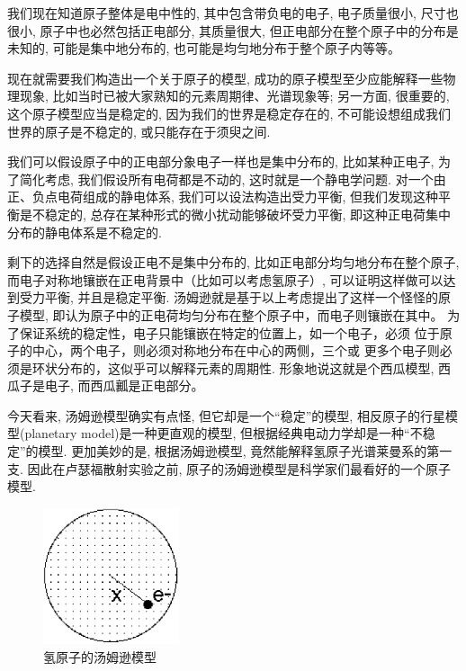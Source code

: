 我们现在知道原子整体是电中性的, 其中包含带负电的电子, 电子质量很小,
尺寸也很小, 原子中也必然包括正电部分, 其质量很大,
但正电部分在整个原子中的分布是未知的, 可能是集中地分布的,
也可能是均匀地分布于整个原子内等等。


现在就需要我们构造出一个关于原子的模型,
成功的原子模型至少应能解释一些物理现象,
比如当时已被大家熟知的元素周期律、光谱现象等; 另一方面, 很重要的,
这个原子模型应当是稳定的, 因为我们的世界是稳定存在的,
不可能设想组成我们世界的原子是不稳定的, 或只能存在于须臾之间.

我们可以假设原子中的正电部分象电子一样也是集中分布的,
比如某种正电子, 为了简化考虑, 我们假设所有电荷都是不动的,
这时就是一个静电学问题. 对一个由正、负点电荷组成的静电体系,
我们可以设法构造出受力平衡, 但我们发现这种平衡是不稳定的,
总存在某种形式的微小扰动能够破坏受力平衡,
即这种正电荷集中分布的静电体系是不稳定的.

剩下的选择自然是假设正电不是集中分布的,
比如正电部分均匀地分布在整个原子,
而电子对称地镶嵌在正电背景中（比如可以考虑氢原子）,
可以证明这样做可以达到受力平衡, 并且是稳定平衡.
汤姆逊就是基于以上考虑提出了这样一个怪怪的原子模型,
即认为原子中的正电荷均匀分布在整个原子中，而电子则镶嵌在其中。
为了保证系统的稳定性，电子只能镶嵌在特定的位置上，如一个电子，必须
位于原子的中心，两个电子，则必须对称地分布在中心的两侧，三个或
更多个电子则必须是环状分布的，这似乎可以解释元素的周期性.
形象地说这就是个西瓜模型, 西瓜子是电子, 而西瓜瓤是正电部分。


今天看来, 汤姆逊模型确实有点怪, 但它却是一个“稳定”的模型,
相反原子的行星模型(planetary model)是一种更直观的模型,
但根据经典电动力学却是一种“不稳定”的模型. 更加美妙的是,
根据汤姆逊模型, 竟然能解释氢原子光谱莱曼系的第一支.
因此在卢瑟福散射实验之前,
原子的汤姆逊模型是科学家们最看好的一个原子模型.

\begin{figure}[h]
\begin{center}
\includegraphics[clip,width=4cm]{AtomIdea/1-2.eps}
\caption{氢原子的汤姆逊模型}
\end{center}
\end{figure}

